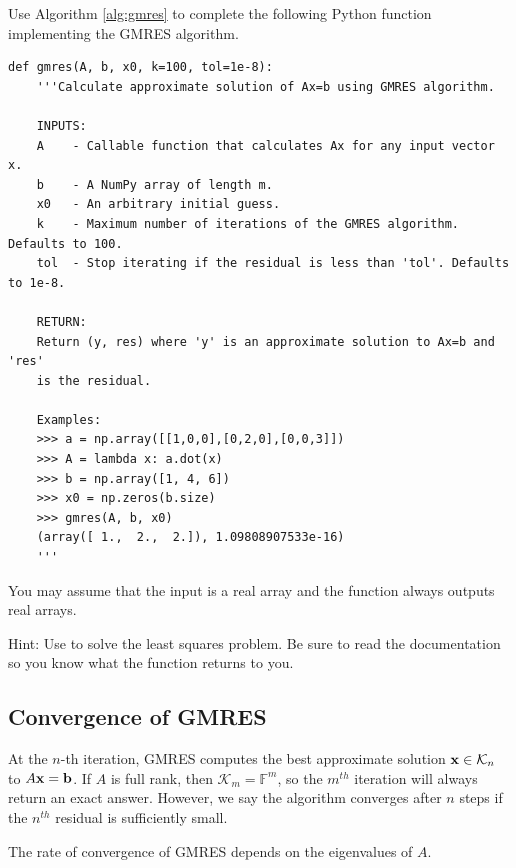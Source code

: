 \begin{problem}
Use Algorithm \ref{alg:gmres} to complete the following Python function implementing the GMRES algorithm.
\begin{lstlisting}
def gmres(A, b, x0, k=100, tol=1e-8):
    '''Calculate approximate solution of Ax=b using GMRES algorithm.
    
    INPUTS:
    A    - Callable function that calculates Ax for any input vector x.
    b    - A NumPy array of length m.
    x0   - An arbitrary initial guess.
    k    - Maximum number of iterations of the GMRES algorithm. Defaults to 100.
    tol  - Stop iterating if the residual is less than 'tol'. Defaults to 1e-8.
    
    RETURN:
    Return (y, res) where 'y' is an approximate solution to Ax=b and 'res' 
    is the residual.
    
    Examples:
    >>> a = np.array([[1,0,0],[0,2,0],[0,0,3]])
    >>> A = lambda x: a.dot(x)
    >>> b = np.array([1, 4, 6])
    >>> x0 = np.zeros(b.size)
    >>> gmres(A, b, x0)
    (array([ 1.,  2.,  2.]), 1.09808907533e-16)
    '''
\end{lstlisting}
You may assume that the input  is a real array and the function  always outputs real arrays.

Hint: Use  to solve the least squares problem.  Be sure to read the documentation so you know what the function returns to you.
\label{prob:MyGMRES}
\end{problem}



\subsection*{Convergence of GMRES}
At the $n$-th iteration, GMRES computes the best approximate solution ${\bf x} \in \mathcal{K}_n$ to $A{\bf x} = {\bf b}$.
If $A$ is full rank, then $\mathcal{K}_m = \mathbb{F}^m$, so the $m^{th}$ iteration will always return an exact answer.
However, we say the algorithm converges after $n$ steps if the $n^{th}$ residual is sufficiently small.

The rate of convergence of GMRES depends on the eigenvalues of $A$.

